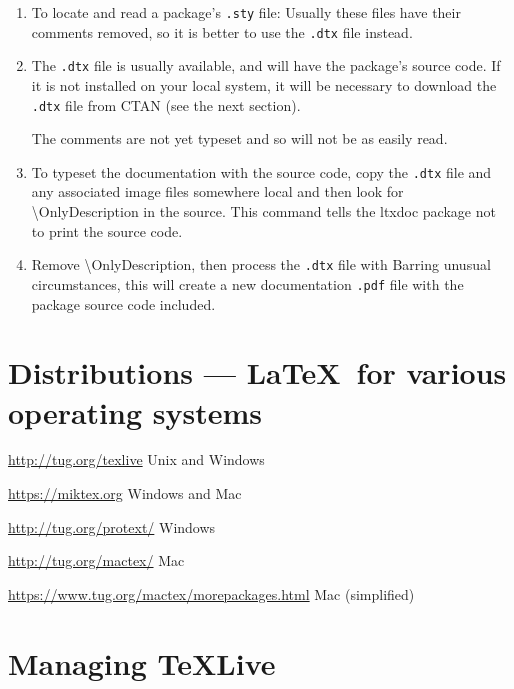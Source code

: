 \documentclass{article}
\DeclareRobustCommand{\cs}[1]{{\tt \char`\\#1}}
\def\\{ }%
\def\pkg#1{#1}%
\def\cs#1{\textbackslash#1}%
\def\LaTeX{LaTeX}%
\def\Dash{ --- }%
\renewcommand*{\pkg}[1]{#1}
\renewcommand*{\LaTeX}{LaTeX}
\renewcommand*{\Dash}{ --- }
\begin{document}
\begin{enumerate}
\item To locate and read a package's \verb+.sty+ file:
Usually these files have their comments removed,
so it is better to use the \verb+.dtx+ file instead.
\item The \verb+.dtx+ file is usually available,
and will have the package's source code.
If it is not installed on your local system, it will
be necessary to download the \verb+.dtx+ file from
CTAN (see the next section).

The comments are not yet typeset and so
will not be as easily read.
\item To typeset the documentation with the source code,
copy the \verb+.dtx+ file and any associated image files
somewhere local and then look for
\cs{OnlyDescription}
in the source.
This command tells the \pkg{ltxdoc} package not to print the source code.
\item Remove \cs{OnlyDescription}, then process the \verb+.dtx+ file with
Barring unusual circumstances, this will create a new documentation
\verb+.pdf+ file with the package source code included.
\end{enumerate}


\section{Distributions \Dash \LaTeX\ for various operating systems}
\begin{description}[style=unboxed]
\item[TeXLive:] \url{http://tug.org/texlive} \hfill Unix and Windows
\item[MiKTex:] \url{https://miktex.org}  \hfill Windows and Mac
\item[proTeXt:] \url{http://tug.org/protext/}  \hfill Windows
\item[MacTeX:] \url{http://tug.org/mactex/} \hfill Mac
\item[BasicTeX:] \url{https://www.tug.org/mactex/morepackages.html} \hfill Mac (simplified)
\end{description}


\section{Managing TeXLive}

\printbibliography[
    heading=none,
    category=TeXLive,
]
\end{document}
